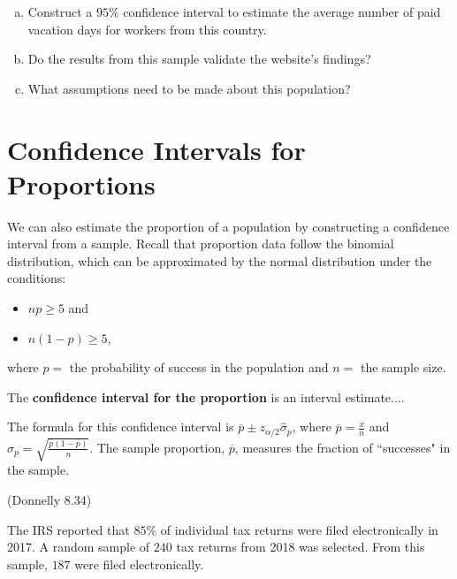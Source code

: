\documentclass[12pt, letterpaper]{article}
\newcounter{exercise}
\theoremstyle{definition}
\begin{document}
\begin{enumerate}[(a)]

\item Construct a $95\%$ confidence interval to estimate the average number of paid vacation days for workers from this country.

\vfill

\item Do the results from this sample validate the website's findings?

\vfill

\item What assumptions need to be made about this population?

\vfill

\end{enumerate}


\newpage


\section*{Confidence Intervals for Proportions}


\noindent We can also estimate the proportion of a population by constructing a confidence interval from a sample.  Recall that proportion data follow the binomial distribution, which can be approximated by the normal distribution under the conditions:
\begin{itemize}
\item $np\geq 5$ and
\item $n(1-p)\geq 5$,
\end{itemize}
where $p=$ the probability of success in the population and $n=$ the sample size.



\begin{defn}
The \textbf{confidence interval for the proportion} is an interval estimate....
\vspace*{.4in}

\noindent The formula for this confidence interval is $\overline{p}\pm z_{\alpha/2}\hat{\sigma}_p$, where $\overline{p}=\frac{x}{n}$ and $\hat{\sigma}_p = \sqrt{\frac{\overline{p}(1-\overline{p})}{n}}$.  The sample proportion, $\overline{p}$, measures the fraction of ``successes" in the sample.
\end{defn}


\begin{exercise}  (Donnelly 8.34)

The IRS reported that $85\%$ of individual tax returns were filed electronically in 2017.  A random sample of $240$ tax returns from 2018 was selected.  From this sample, $187$ were filed electronically.

\end{exercise}
\end{document}

